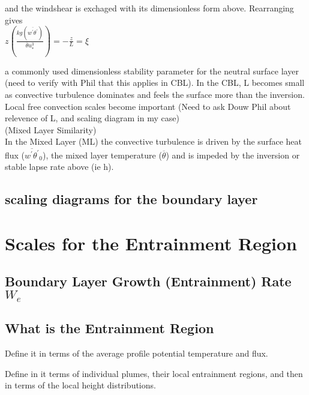 and the windshear is exchaged with its dimensionless form above.  Rearranging gives\\

$z \left( \frac{kg \left( \overline{w^{'} \theta^{'}} \right) }{\overline{\theta} u_{*}^{3}} \right) = -\frac{z}{L} = \xi$      

a commonly used dimensionless stability parameter for the neutral surface layer (need to verify with Phil that this applies in CBL).
In the CBL, L becomes small as convective turbulence dominates and feels the surface more than the inversion.  Local free convection
scales become important (Need to ask Douw Phil about relevence of L, and scaling diagram in my case)\\

(Mixed Layer Similarity)\\

In the Mixed Layer (ML) the convective turbulence is driven by the surface heat flux ($\overline{w^{'}\theta^{'}}_{0}$), the mixed layer 
temperature ($\overline{\theta}$) and is impeded by the inversion or stable lapse rate above (ie h).   
\cite{Stull-BLMetIntro}

\subsection{scaling diagrams for the boundary layer}


\section{Scales for the Entrainment Region}
\label{sec:ScalesfortheEntrainmnetRegion}

\subsection{Boundary Layer Growth (Entrainment) Rate $W_{e}$}

\subsection{What is the Entrainment Region} 
Define it in terms of the average profile potential temperature and flux.

Define in it terms of individual plumes, their local entrainment regions, and then in terms of the local height distributions.\\


